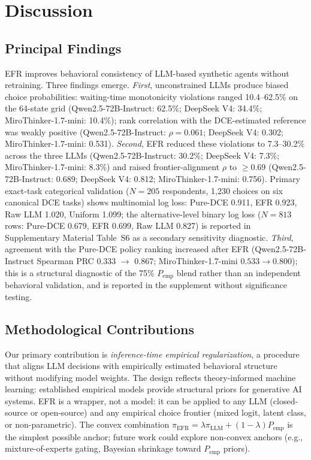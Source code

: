 \documentclass[11pt]{article}
\begin{document}
\section{Discussion}
\subsection{Principal Findings}

EFR improves behavioral consistency of LLM-based synthetic agents without retraining. Three findings emerge. \emph{First}, unconstrained LLMs produce biased choice probabilities: waiting-time monotonicity violations ranged 10.4--62.5\% on the 64-state grid (Qwen2.5-72B-Instruct: 62.5\%; DeepSeek V4: 34.4\%; MiroThinker-1.7-mini: 10.4\%); rank correlation with the DCE-estimated reference was weakly positive (Qwen2.5-72B-Instruct: $\rho = 0.061$; DeepSeek V4: 0.302; MiroThinker-1.7-mini: 0.531). \emph{Second}, EFR reduced these violations to 7.3--30.2\% across the three LLMs (Qwen2.5-72B-Instruct: 30.2\%; DeepSeek V4: 7.3\%; MiroThinker-1.7-mini: 8.3\%) and raised frontier-alignment $\rho$ to $\geq 0.69$ (Qwen2.5-72B-Instruct: 0.689; DeepSeek V4: 0.812; MiroThinker-1.7-mini: 0.756). Primary exact-task categorical validation ($N=205$ respondents, 1,230 choices on six canonical DCE tasks) shows multinomial log loss: Pure-DCE 0.911, EFR 0.923, Raw LLM 1.020, Uniform 1.099; the alternative-level binary log loss ($N=813$ rows: Pure-DCE 0.679, EFR 0.699, Raw LLM 0.827) is reported in Supplementary Material Table~S6 as a secondary sensitivity diagnostic. \emph{Third}, agreement with the Pure-DCE policy ranking increased after EFR (Qwen2.5-72B-Instruct Spearman PRC 0.333 $\to$ 0.867; MiroThinker-1.7-mini $0.533 \to 0.800$); this is a structural diagnostic of the 75\% $P_{\text{emp}}$ blend rather than an independent behavioral validation, and is reported in the supplement without significance testing.

\subsection{Methodological Contributions}

Our primary contribution is \emph{inference-time empirical regularization}, a procedure that aligns LLM decisions with empirically estimated behavioral structure without modifying model weights. The design reflects theory-informed machine learning: established empirical models provide structural priors for generative AI systems. EFR is a wrapper, not a model: it can be applied to any LLM (closed-source or open-source) and any empirical choice frontier (mixed logit, latent class, or non-parametric). The convex combination $\pi_{\mathrm{EFR}} = \lambda \pi_{\mathrm{LLM}} + (1-\lambda) P_{\mathrm{emp}}$ is the simplest possible anchor; future work could explore non-convex anchors (e.g., mixture-of-experts gating, Bayesian shrinkage toward $P_{\mathrm{emp}}$ priors).
\end{document}
